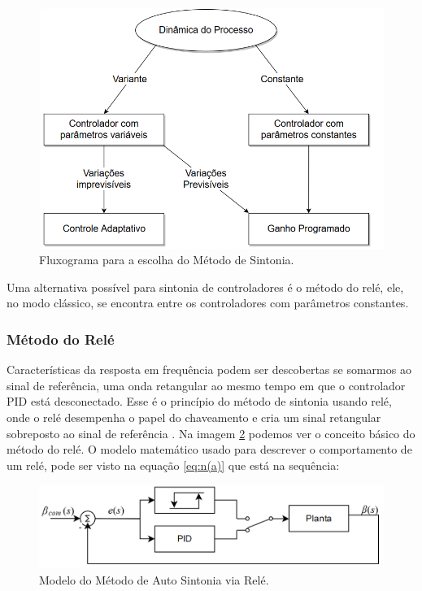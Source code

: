 \begin{figure}[H]
  \caption{Fluxograma para a escolha do Método de Sintonia.}
  \begin{center}
      \includegraphics[scale=0.55]{img/escolha_controle_astrom_p236}
  \end{center}
  \label{fig:escolha_controle_astrom_p236}
\end{figure}

Uma alternativa possível para sintonia de controladores é o método do relé, ele, no modo clássico, se encontra entre os controladores com parâmetros constantes.



\subsubsection{Método do Relé}

Características da resposta em frequência podem ser descobertas se somarmos ao sinal de referência, uma onda retangular ao mesmo tempo em que o controlador PID está desconectado. Esse é o princípio do método de sintonia usando relé, onde o relé desempenha o papel do chaveamento e cria um sinal retangular sobreposto ao sinal de referência \cite{Levine1996}. Na imagem \ref{fig:pid_autotuning_relay_astrom_p239} podemos ver o conceito básico do método do relé. O modelo matemático usado para descrever o comportamento de um relé, pode ser visto na equação \ref{eq:n(a)} que está na sequência:
 
\begin{figure}[H]
  \caption{Modelo do Método de Auto Sintonia via Relé.}
  \begin{center}
      \includegraphics[scale=0.55]{img/pid_autotuning_relay_astrom_p239}
  \end{center}
  \label{fig:pid_autotuning_relay_astrom_p239}
\end{figure}


